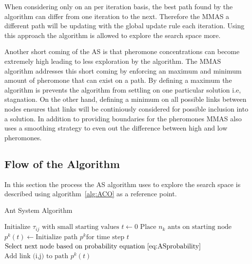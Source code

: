 When considering only on an per iteration basis, the best path found by the algorithm can differ from one iteration to the next\cite{FundamentalSwarm}. Therefore the MMAS a different path will be updating with the global update rule each iteration\cite{FundamentalSwarm}. Using this approach the algorithm is allowed to explore the search space more\cite{FundamentalSwarm}.

Another short coming of the AS is that pheromone concentrations can become extremely high leading to less exploration by the algorithm\cite{FundamentalSwarm}. The MMAS algorithm addresses this short coming by enforcing an maximum and minimum amount of pheromone that can exist on a path\cite{FundamentalSwarm}. By defining a maximum the algorithm is prevents the algorithm from settling on one particular solution i.e, stagnation\cite{FundamentalSwarm}. On the other hand, defining a minimum on all possible links between nodes ensures that links will be continiously considered for possible inclusion into a solution\cite{FundamentalSwarm}. In addition to providing boundaries for the pheromones MMAS also uses a smoothing strategy to even out the difference between high and low pheromones\cite{FundamentalSwarm}.

\subsection{Flow of the Algorithm}
In this section the process the AS algorithm uses to explore the search space is described using algorithm~\ref{alg:ACO} as a reference point.
\begin{algorithm}[H]
\caption{Ant System Algorithm~\cite{CompuIntelligenceIntro}}
\label{alg:ACO}
	\begin{algorithmic}[1]
	\State$\text{Initialize $\tau_{ij}$ with small starting values}$
	\State$t \leftarrow 0$
	\State$\text{Place $n_k$ ants on starting node}$
			\State$p^k(t) \leftarrow \text{Initialize path } p^k \text{for time step } t$
			\Repeat
				\State$\text{Select next node based on probability equation~\ref{eq:ASprobability}}$
				\State$\text{Add link (i,j) to path } p^k(t)$
	\end{algorithmic}
\end{algorithm}

